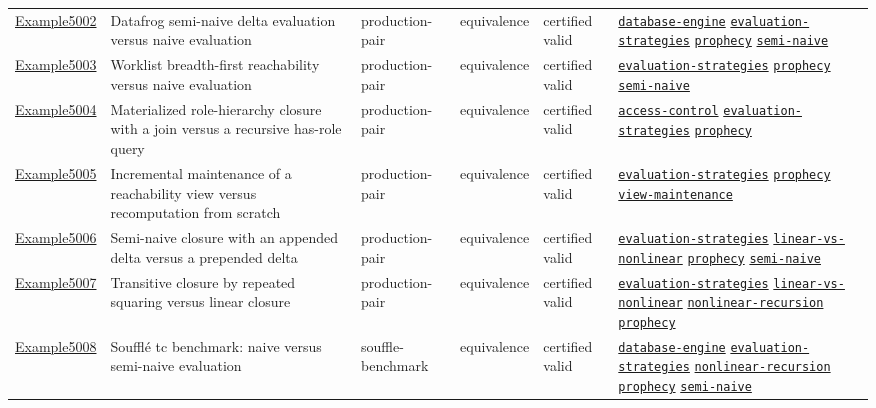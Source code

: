 \documentclass[10pt]{article}
\begin{document}
\begin{longtable}{@{}lp{}p{}p{}p{}p{}@{}}
\hyperref[case:Example5002]{Example5002} & Datafrog semi-naive delta evaluation versus naive evaluation & production-pair & equivalence & certified valid & {\scriptsize \hyperref[tag:database-engine]{\texttt{database-engine}} \hyperref[tag:evaluation-strategies]{\texttt{evaluation-strategies}} \hyperref[tag:prophecy]{\texttt{prophecy}} \hyperref[tag:semi-naive]{\texttt{semi-naive}}} \\
\hyperref[case:Example5003]{Example5003} & Worklist breadth-first reachability versus naive evaluation & production-pair & equivalence & certified valid & {\scriptsize \hyperref[tag:evaluation-strategies]{\texttt{evaluation-strategies}} \hyperref[tag:prophecy]{\texttt{prophecy}} \hyperref[tag:semi-naive]{\texttt{semi-naive}}} \\
\hyperref[case:Example5004]{Example5004} & Materialized role-hierarchy closure with a join versus a recursive has-role query & production-pair & equivalence & certified valid & {\scriptsize \hyperref[tag:access-control]{\texttt{access-control}} \hyperref[tag:evaluation-strategies]{\texttt{evaluation-strategies}} \hyperref[tag:prophecy]{\texttt{prophecy}}} \\
\hyperref[case:Example5005]{Example5005} & Incremental maintenance of a reachability view versus recomputation from scratch & production-pair & equivalence & certified valid & {\scriptsize \hyperref[tag:evaluation-strategies]{\texttt{evaluation-strategies}} \hyperref[tag:prophecy]{\texttt{prophecy}} \hyperref[tag:view-maintenance]{\texttt{view-maintenance}}} \\
\hyperref[case:Example5006]{Example5006} & Semi-naive closure with an appended delta versus a prepended delta & production-pair & equivalence & certified valid & {\scriptsize \hyperref[tag:evaluation-strategies]{\texttt{evaluation-strategies}} \hyperref[tag:linear-vs-nonlinear]{\texttt{linear-vs-nonlinear}} \hyperref[tag:prophecy]{\texttt{prophecy}} \hyperref[tag:semi-naive]{\texttt{semi-naive}}} \\
\hyperref[case:Example5007]{Example5007} & Transitive closure by repeated squaring versus linear closure & production-pair & equivalence & certified valid & {\scriptsize \hyperref[tag:evaluation-strategies]{\texttt{evaluation-strategies}} \hyperref[tag:linear-vs-nonlinear]{\texttt{linear-vs-nonlinear}} \hyperref[tag:nonlinear-recursion]{\texttt{nonlinear-recursion}} \hyperref[tag:prophecy]{\texttt{prophecy}}} \\
\hyperref[case:Example5008]{Example5008} & Soufflé tc benchmark: naive versus semi-naive evaluation & souffle-benchmark & equivalence & certified valid & {\scriptsize \hyperref[tag:database-engine]{\texttt{database-engine}} \hyperref[tag:evaluation-strategies]{\texttt{evaluation-strategies}} \hyperref[tag:nonlinear-recursion]{\texttt{nonlinear-recursion}} \hyperref[tag:prophecy]{\texttt{prophecy}} \hyperref[tag:semi-naive]{\texttt{semi-naive}}} \\

\end{longtable}
\end{document}
